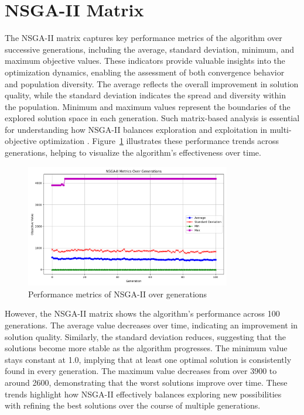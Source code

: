 \section{NSGA-II Matrix}

The NSGA-II matrix captures key performance metrics of the algorithm over successive generations, including the average, standard deviation, minimum, and maximum objective values. These indicators provide valuable insights into the optimization dynamics, enabling the assessment of both convergence behavior and population diversity. The average reflects the overall improvement in solution quality, while the standard deviation indicates the spread and diversity within the population. Minimum and maximum values represent the boundaries of the explored solution space in each generation. Such matrix-based analysis is essential for understanding how NSGA-II balances exploration and exploitation in multi-objective optimization \cite{A Fast and Elitist Multi-objective Genetic Algorithm: NSGA-II}. Figure~\ref{fig:nsga2_metrics} illustrates these performance trends across generations, helping to visualize the algorithm’s effectiveness over time.

\begin{figure}[h!]
    \centering
    \includegraphics[width=0.8\textwidth]{../Figures/nsga2_metrics.png}
    \caption{Performance metrics of NSGA-II over generations}
    \label{fig:nsga2_metrics}
\end{figure}
\newpage
However, the NSGA-II matrix shows the algorithm's performance across 100 generations. The average value decreases over time, indicating an improvement in solution quality. Similarly, the standard deviation reduces, suggesting that the solutions become more stable as the algorithm progresses. The minimum value stays constant at 1.0, implying that at least one optimal solution is consistently found in every generation. The maximum value decreases from over 3900 to around 2600, demonstrating that the worst solutions improve over time. These trends highlight how NSGA-II effectively balances exploring new possibilities with refining the best solutions over the course of multiple generations.
\newpage
